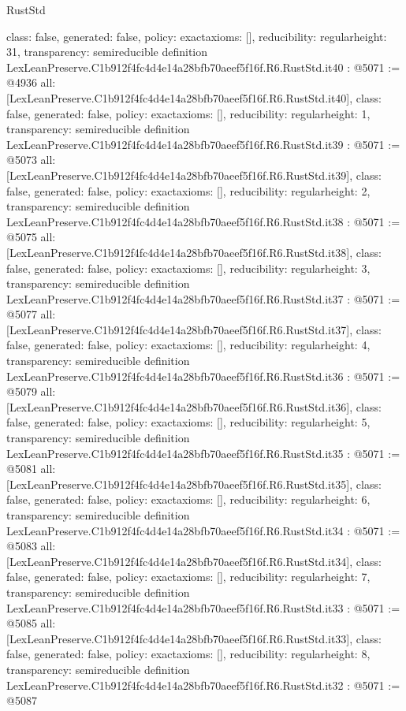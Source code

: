 \begin{lexlean}{RustStd}
\begin{coremodule}
{  class: false,
  generated: false,
  policy: exact{axioms: []},
  reducibility: regular{height: 31},
  transparency: semireducible
}
definition LexLeanPreserve.C1b912f4fc4d4e14a28bfb70aeef5f16f.R6.RustStd.it40 : @5071 := @4936 {
  all: [LexLeanPreserve.C1b912f4fc4d4e14a28bfb70aeef5f16f.R6.RustStd.it40],
  class: false,
  generated: false,
  policy: exact{axioms: []},
  reducibility: regular{height: 1},
  transparency: semireducible
}
definition LexLeanPreserve.C1b912f4fc4d4e14a28bfb70aeef5f16f.R6.RustStd.it39 : @5071 := @5073 {
  all: [LexLeanPreserve.C1b912f4fc4d4e14a28bfb70aeef5f16f.R6.RustStd.it39],
  class: false,
  generated: false,
  policy: exact{axioms: []},
  reducibility: regular{height: 2},
  transparency: semireducible
}
definition LexLeanPreserve.C1b912f4fc4d4e14a28bfb70aeef5f16f.R6.RustStd.it38 : @5071 := @5075 {
  all: [LexLeanPreserve.C1b912f4fc4d4e14a28bfb70aeef5f16f.R6.RustStd.it38],
  class: false,
  generated: false,
  policy: exact{axioms: []},
  reducibility: regular{height: 3},
  transparency: semireducible
}
definition LexLeanPreserve.C1b912f4fc4d4e14a28bfb70aeef5f16f.R6.RustStd.it37 : @5071 := @5077 {
  all: [LexLeanPreserve.C1b912f4fc4d4e14a28bfb70aeef5f16f.R6.RustStd.it37],
  class: false,
  generated: false,
  policy: exact{axioms: []},
  reducibility: regular{height: 4},
  transparency: semireducible
}
definition LexLeanPreserve.C1b912f4fc4d4e14a28bfb70aeef5f16f.R6.RustStd.it36 : @5071 := @5079 {
  all: [LexLeanPreserve.C1b912f4fc4d4e14a28bfb70aeef5f16f.R6.RustStd.it36],
  class: false,
  generated: false,
  policy: exact{axioms: []},
  reducibility: regular{height: 5},
  transparency: semireducible
}
definition LexLeanPreserve.C1b912f4fc4d4e14a28bfb70aeef5f16f.R6.RustStd.it35 : @5071 := @5081 {
  all: [LexLeanPreserve.C1b912f4fc4d4e14a28bfb70aeef5f16f.R6.RustStd.it35],
  class: false,
  generated: false,
  policy: exact{axioms: []},
  reducibility: regular{height: 6},
  transparency: semireducible
}
definition LexLeanPreserve.C1b912f4fc4d4e14a28bfb70aeef5f16f.R6.RustStd.it34 : @5071 := @5083 {
  all: [LexLeanPreserve.C1b912f4fc4d4e14a28bfb70aeef5f16f.R6.RustStd.it34],
  class: false,
  generated: false,
  policy: exact{axioms: []},
  reducibility: regular{height: 7},
  transparency: semireducible
}
definition LexLeanPreserve.C1b912f4fc4d4e14a28bfb70aeef5f16f.R6.RustStd.it33 : @5071 := @5085 {
  all: [LexLeanPreserve.C1b912f4fc4d4e14a28bfb70aeef5f16f.R6.RustStd.it33],
  class: false,
  generated: false,
  policy: exact{axioms: []},
  reducibility: regular{height: 8},
  transparency: semireducible
}
definition LexLeanPreserve.C1b912f4fc4d4e14a28bfb70aeef5f16f.R6.RustStd.it32 : @5071 := @5087 {
}
\end{coremodule}
\end{lexlean}
